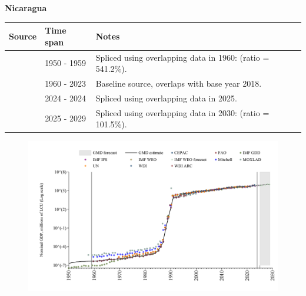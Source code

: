 \documentclass[12pt,a4paper,landscape]{article}
\begin{document}
\begin{adjustbox}{max totalsize={\paperwidth}{\paperheight},center}
\begin{minipage}[t][\textheight][t]{\textwidth}
\vspace*{0.5cm}
{}
\begin{center}
{\Large\bfseries Nicaragua}
\end{center}
\vspace{0.5cm}
\begin{table}[H]
\centering
\small
\begin{tabular}{|l|l|l|}
\hline
\textbf{Source} & \textbf{Time span} & \textbf{Notes} \\
\hline
\rowcolor{white}\cite{IMF_GDD}& 1950 - 1959 &Spliced using overlapping data in 1960: (ratio = 541.2\%).\\
\rowcolor{lightgray}\cite{WDI}& 1960 - 2023 &Baseline source, overlaps with base year 2018.\\
\rowcolor{white}\cite{IMF_IFS}& 2024 - 2024 &Spliced using overlapping data in 2025.\\
\rowcolor{lightgray}\cite{IMF_WEO_forecast}& 2025 - 2029 &Spliced using overlapping data in 2030: (ratio = 101.5\%).\\
\hline
\end{tabular}
\end{table}
\begin{figure}[H]
\centering
\includegraphics[width=\textwidth,height=0.6\textheight,keepaspectratio]{graphs/NIC_nGDP.pdf}
\end{figure}
\end{minipage}
\end{adjustbox}
\end{document}
